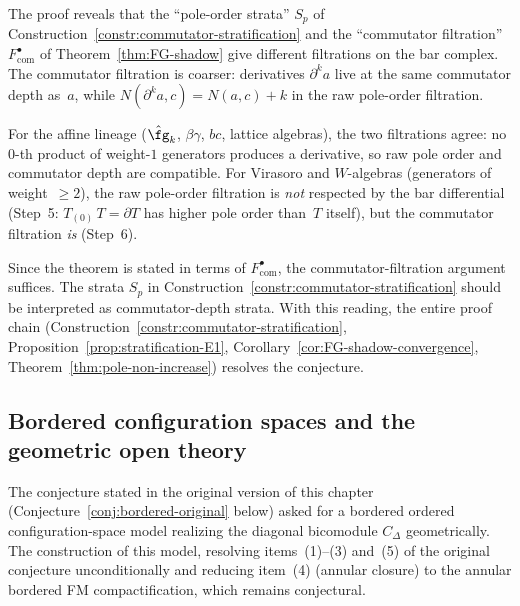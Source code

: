 \begin{remark}
\label{rem:virasoro-pole-subtlety}
The proof reveals that the ``pole-order strata'' $S_p$ of
Construction~\ref{constr:commutator-stratification} and the
``commutator filtration'' $F_{\mathrm{com}}^\bullet$ of
Theorem~\ref{thm:FG-shadow} give different filtrations on the bar complex.
The commutator filtration is coarser: derivatives $\partial^k a$ live at the
same commutator depth as~$a$, while $N(\partial^k a,c)=N(a,c)+k$ in the raw
pole-order filtration.

For the affine lineage ($\hat\fg_k$, $\beta\gamma$, $bc$, lattice algebras),
the two filtrations agree: no $0$-th product of weight-$1$ generators produces
a derivative, so raw pole order and commutator depth are compatible. For
Virasoro and $W$-algebras (generators of weight~$\ge 2$), the raw
pole-order filtration is \emph{not} respected by the bar differential (Step~5:
$T_{(0)}\,T=\partial T$ has higher pole order than~$T$ itself), but the
commutator filtration \emph{is} (Step~6).

Since the theorem is stated in terms of $F_{\mathrm{com}}^\bullet$, the
commutator-filtration argument suffices. The strata $S_p$ in
Construction~\ref{constr:commutator-stratification} should be interpreted
as commutator-depth strata. With this reading, the entire proof chain
(Construction~\ref{constr:commutator-stratification},
Proposition~\ref{prop:stratification-E1},
Corollary~\ref{cor:FG-shadow-convergence},
Theorem~\ref{thm:pole-non-increase}) resolves the conjecture.
\end{remark}

\subsection{Bordered configuration spaces and the geometric open theory}
\label{subsec:bordered-config}

\providecommand{\FM}{\mathrm{FM}}
\providecommand{\Conf}{\mathrm{Conf}}
\providecommand{\BM}{\mathrm{BM}}

The conjecture stated in the original version of this chapter
(Conjecture~\ref{conj:bordered-original} below) asked for a bordered
ordered configuration-space model realizing the diagonal bicomodule
$C_\Delta$ geometrically. The construction of this model, resolving
items~(1)--(3) and~(5) of the original conjecture unconditionally
and reducing item~(4) (annular closure) to the annular bordered FM
compactification, which remains conjectural.

